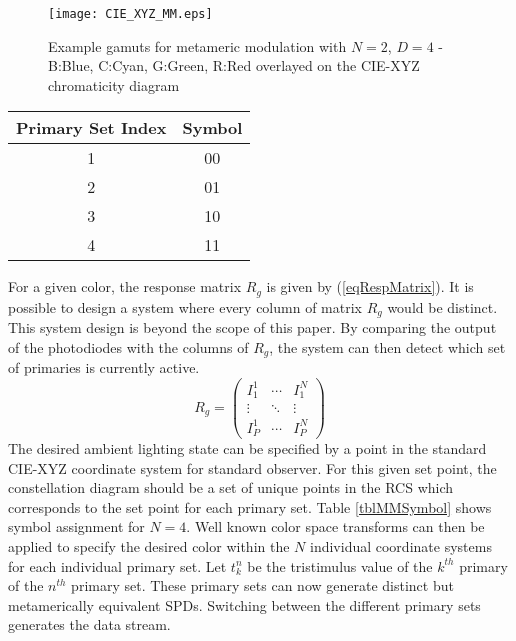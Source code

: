 \begin{figure}
	\centering
    \texttt{[image: CIE\_XYZ\_MM.eps]}
	\caption{Example gamuts for metameric modulation with $N=2$, $D=4$ - B:Blue, C:Cyan, G:Green, R:Red overlayed on the CIE-XYZ chromaticity diagram}
	\label{figCIEXYZMM}
\end{figure}

\begin{table*}[b]
	\centering
		\begin{tabular}{|c|c|}
		\hline
		{Primary Set Index} & {Symbol}\\
		\hline
		1 & 00\\
		2 & 01\\
		3 & 10\\
		4 & 11\\
		\hline
		\end{tabular}
	\caption{Metameric Channel Symbol Assignment}
	\label{tblMMSymbol}
\end{table*}

For a given color, the response matrix $R_{g}$ is given by (\ref{eqRespMatrix}). It is possible to design a system where every column of matrix $R_{g}$ would be distinct. This system design is beyond the scope of this paper. By comparing the output of the photodiodes with the columns of $R_{g}$, the system can then detect which set of primaries is currently active.
\begin{equation}
	\label{eqRespMatrix}
R_{g} = \left( \begin{array}{ccc}
I_{1}^{1}&\cdots&I_{1}^{N}\\
\vdots&\ddots&\vdots\\
I_{P}^{1}&\cdots&I_{P}^{N}
\end{array} \right)
\end{equation}
The desired ambient lighting state can be specified by a point in the standard CIE-XYZ coordinate system for standard observer. For this given set point, the constellation diagram should be a set of unique points in the RCS which corresponds to the set point for each primary set. Table \ref{tblMMSymbol} shows symbol assignment for $N=4$. Well known color space transforms can then be applied to specify the desired color within the $N$ individual coordinate systems for each individual primary set. Let $t_{k}^{n}$ be the tristimulus value of the $k^{th}$ primary of the $n^{th}$ primary set. These primary sets can now generate distinct but metamerically equivalent SPDs. Switching between the different primary sets generates the data stream.


